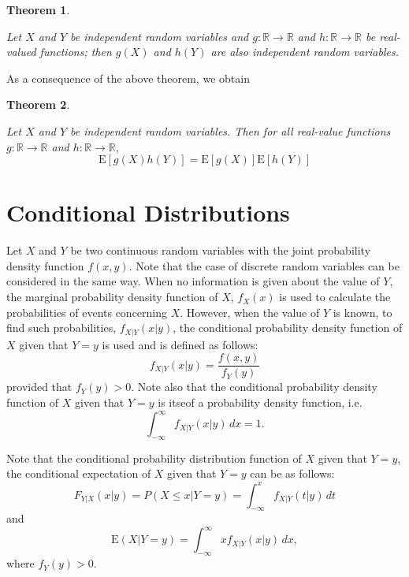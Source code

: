 \documentclass[
]{book}
\newtheorem{theorem}{Theorem}[chapter]
\theoremstyle{definition}
\theoremstyle{definition}
\theoremstyle{definition}
\theoremstyle{definition}
\theoremstyle{remark}
\begin{document}
\begin{theorem}
\protect\hypertarget{thm:unlabeled-div-24}{}\label{thm:unlabeled-div-24}

\emph{Let \(X\) and \(Y\) be independent random variables and
\(g : \mathbb{R} \rightarrow\mathbb{R}\) and
\(h : \mathbb{R} \rightarrow\mathbb{R}\) be real-valued functions; then
\(g(X)\) and \(h(Y )\) are also independent random variables.}

\end{theorem}

As a consequence of the above theorem, we obtain

\begin{theorem}
\protect\hypertarget{thm:unlabeled-div-25}{}\label{thm:unlabeled-div-25}

\emph{Let \(X\) and \(Y\) be independent random variables. Then
for all real-value functions \(g : \mathbb{R} \rightarrow\mathbb{R}\) and
\(h : \mathbb{R} \rightarrow\mathbb{R}\),
\[\mathrm{E}[g(X)h(Y)] = \mathrm{E}[g(X)]\mathrm{E}[h(Y)]\] }

\end{theorem}

\hypertarget{conditional-distributions}{%
\section{Conditional Distributions}\label{conditional-distributions}}

Let \(X\) and \(Y\) be two continuous random variables with the joint
probability density function \(f (x, y)\). Note that the case of discrete
random variables can be considered in the same way. When no information
is given about the value of \(Y\), the marginal probability density
function of \(X\), \(f_X(x)\) is used to calculate the probabilities of
events concerning \(X\). However, when the value of \(Y\) is known, to find
such probabilities, \(f_{X|Y} (x|y)\), the conditional probability density
function of \(X\) given that \(Y = y\) is used and is defined as follows:
\[f_{X|Y} (x|y)  = \frac{f(x,y)}{f_Y(y)}\] provided that \(f_Y (y) > 0\).
Note also that the conditional probability density function of \(X\) given
that \(Y = y\) is itseof a probability density function, i.e.
\[\int_{-\infty}^\infty f_{X|Y}(x|y)\, dx  =  1.\]

Note that the conditional probability distribution function of \(X\) given
that \(Y = y\), the conditional expectation of \(X\) given that \(Y = y\) can
be as follows:
\[F_{Y|X}(x|y) = P(X \le x | Y = y) = \int_ {-\infty}^x f_{X|Y}(t|y) \, dt\]
and
\[\mathrm{E}(X|Y = y) =  \int_{-\infty}^{\infty} x  f_{X|Y}(x|y) \, dx,\]
where \(f_Y(y) > 0\).
\end{document}
